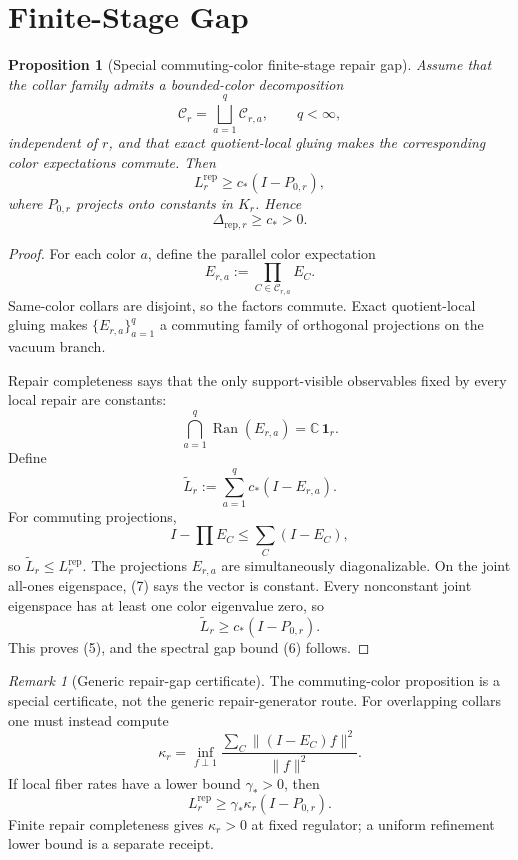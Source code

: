\documentclass[11pt]{article}
\numberwithin{equation}{section}
\newtheorem{proposition}[theorem]{Proposition}
\theoremstyle{remark}
\newtheorem{remark}[theorem]{Remark}
\newcommand{\Rep}{\mathrm{rep}}
\newcommand{\C}{\mathbb C}
\begin{document}
\section{Finite-Stage Gap}

\begin{proposition}[Special commuting-color finite-stage repair gap]
\label{prop:finite-gap}
Assume that the collar family admits a bounded-color decomposition
\[
\mathcal C_r=\bigsqcup_{a=1}^{q}\mathcal C_{r,a},
\qquad q<\infty,
\tag{4}
\]
independent of \(r\), and that exact quotient-local gluing makes the corresponding color
expectations commute. Then
\[
L_r^{\Rep}\ge c_*(I-P_{0,r}),
\tag{5}
\]
where \(P_{0,r}\) projects onto constants in \(K_r\). Hence
\[
\Delta_{\mathrm{rep},r}\ge c_*>0.
\tag{6}
\]
\end{proposition}

\begin{proof}
For each color \(a\), define the parallel color expectation
\[
E_{r,a}:=\prod_{C\in\mathcal C_{r,a}}E_C.
\]
Same-color collars are disjoint, so the factors commute. Exact quotient-local gluing makes
\(\{E_{r,a}\}_{a=1}^{q}\) a commuting family of orthogonal projections on the vacuum branch.

Repair completeness says that the only support-visible observables fixed by every local repair
are constants:
\[
\bigcap_{a=1}^{q}\operatorname{Ran}(E_{r,a})=\C\,\mathbf 1_r.
\tag{7}
\]
Define
\[
\widetilde L_r:=\sum_{a=1}^{q} c_*(I-E_{r,a}).
\]
For commuting projections,
\[
I-\prod E_C\le \sum_C(I-E_C),
\]
so \(\widetilde L_r\le L_r^{\Rep}\). The projections \(E_{r,a}\) are simultaneously
diagonalizable. On the joint all-ones eigenspace, (7) says the vector is constant. Every
nonconstant joint eigenspace has at least one color eigenvalue zero, so
\[
\widetilde L_r\ge c_*(I-P_{0,r}).
\]
This proves (5), and the spectral gap bound (6) follows.
\end{proof}

\begin{remark}[Generic repair-gap certificate]
The commuting-color proposition is a special certificate, not the generic repair-generator route.
For overlapping collars one must instead compute
\[
\kappa_r=\inf_{f\perp 1}
\frac{\sum_C\|(I-E_C)f\|^2}{\|f\|^2}.
\]
If local fiber rates have a lower bound \(\gamma_*>0\), then
\[
L_r^{\Rep}\ge \gamma_*\kappa_r(I-P_{0,r}).
\]
Finite repair completeness gives \(\kappa_r>0\) at fixed regulator; a uniform refinement lower
bound is a separate receipt.
\end{remark}
\end{document}
